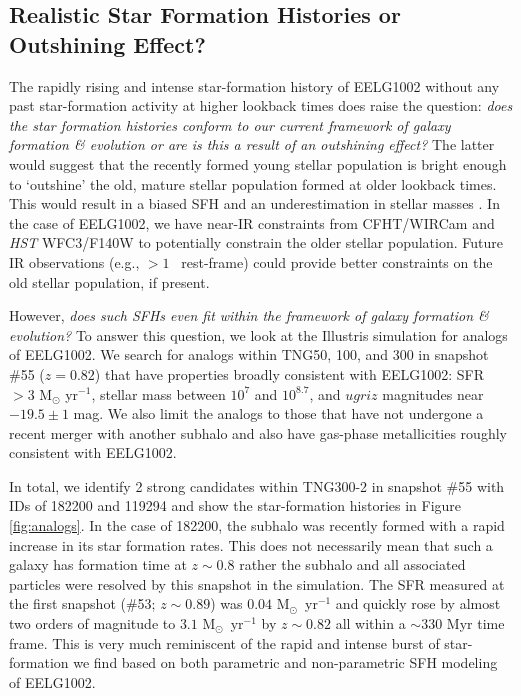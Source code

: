 \documentclass[twocolumn,tight,times,linenumbers]{aastex631}
\newcommand{\msol}{M$_\odot$}
\begin{document}
		\subsection{Realistic Star Formation Histories or Outshining Effect?}
		The rapidly rising and intense star-formation history of EELG1002 without any past star-formation activity at higher lookback times does raise the question: \textit{does the star formation histories conform to our current framework of galaxy formation \& evolution or are is this a result of an outshining effect?} The latter would suggest that the recently formed young stellar population is bright enough to `outshine' the old, mature stellar population formed at older lookback times. This would result in a biased SFH and an underestimation in stellar masses \citep{Narayanan2024}. In the case of EELG1002, we have near-IR constraints from CFHT/WIRCam and \textit{HST} WFC3/F140W to potentially constrain the older stellar population. Future IR observations (e.g., $> 1$ \micron~rest-frame) could provide better constraints on the old stellar population, if present.
			
		However, \textit{does such SFHs even fit within the framework of galaxy formation \& evolution?} To answer this question, we look at the Illustris simulation \citep{Genel2014,Vogelsberger2014,Vogelsberger2014_galpop,Nelson2015} for analogs of EELG1002. We search for analogs within TNG50, 100, and 300 in snapshot \#55 ($z = 0.82$) that have properties broadly consistent with EELG1002: SFR $> 3$ M$_\odot$ yr$^{-1}$, stellar mass between $10^7$ and $10^{8.7}$, and $ugriz$ magnitudes near $-19.5\pm1$ mag. We also limit the analogs to those that have not undergone a recent merger with another subhalo and also have gas-phase metallicities roughly consistent with EELG1002. 
		
		In total, we identify 2 strong candidates within TNG300-2 in snapshot \#55 with IDs of 182200 and 119294 and show the star-formation histories in Figure \ref{fig:analogs}. In the case of 182200, the subhalo was recently formed with a rapid increase in its star formation rates. This does not necessarily mean that such a galaxy has formation time at $z \sim 0.8$ rather the subhalo and all associated particles were resolved by this snapshot in the simulation. The SFR measured at the first snapshot (\#53; $z \sim 0.89$) was $0.04$ \msol~yr$^{-1}$ and quickly rose by almost two orders of magnitude to $3.1$ \msol~yr$^{-1}$ by $z \sim 0.82$ all within a $\sim 330$ Myr time frame. This is very much reminiscent of the rapid and intense burst of star-formation we find based on both parametric and non-parametric SFH modeling of EELG1002.
		
\end{document}
